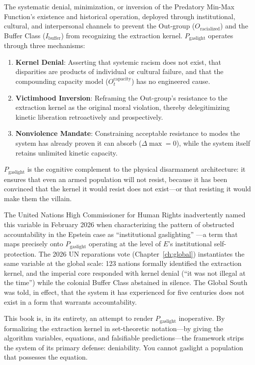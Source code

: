 \begin{definition}
The systematic denial, minimization, or inversion of the Predatory Min-Max Function's existence and historical operation, deployed through institutional, cultural, and interpersonal channels to prevent the Out-group ($O_{\text{racialized}}$) and the Buffer Class ($I_{\text{buffer}}$) from recognizing the extraction kernel. $P_{\text{gaslight}}$ operates through three mechanisms:
\begin{enumerate}
    \item \textbf{Kernel Denial}: Asserting that systemic racism does not exist, that disparities are products of individual or cultural failure, and that the compounding capacity model ($O_t^{\text{capacity}}$) has no engineered cause.
    \item \textbf{Victimhood Inversion}: Reframing the Out-group's resistance to the extraction kernel as the original moral violation, thereby delegitimizing kinetic liberation retroactively and prospectively.
    \item \textbf{Nonviolence Mandate}: Constraining acceptable resistance to modes the system has already proven it can absorb ($\Delta\max = 0$), while the system itself retains unlimited kinetic capacity.
\end{enumerate}
$P_{\text{gaslight}}$ is the cognitive complement to the physical disarmament architecture: it ensures that even an armed population will not resist, because it has been convinced that the kernel it would resist does not exist---or that resisting it would make them the villain.
\end{definition}

The United Nations High Commissioner for Human Rights inadvertently named this variable in February 2026 when characterizing the pattern of obstructed accountability in the Epstein case as ``institutional gaslighting'' \cite{ohchr2026}---a term that maps precisely onto $P_{\text{gaslight}}$ operating at the level of $E$'s institutional self-protection. The 2026 UN reparations vote (Chapter~\ref{ch:global}) instantiates the same variable at the global scale: 123 nations formally identified the extraction kernel, and the imperial core responded with kernel denial (``it was not illegal at the time'') while the colonial Buffer Class abstained in silence. The Global South was told, in effect, that the system it has experienced for five centuries does not exist in a form that warrants accountability.

This book is, in its entirety, an attempt to render $P_{\text{gaslight}}$ inoperative. By formalizing the extraction kernel in set-theoretic notation---by giving the algorithm variables, equations, and falsifiable predictions---the framework strips the system of its primary defense: deniability. You cannot gaslight a population that possesses the equation.

